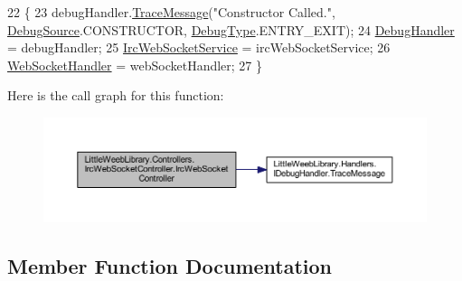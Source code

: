 \begin{DoxyCode}
22         \{
23             debugHandler.\mbox{\hyperlink{interface_little_weeb_library_1_1_handlers_1_1_i_debug_handler_a2e405bc3492e683cd3702fae125221bc}{TraceMessage}}(\textcolor{stringliteral}{"Constructor Called."}, 
      \mbox{\hyperlink{namespace_little_weeb_library_1_1_handlers_a2a6ca0775121c9c503d58aa254d292be}{DebugSource}}.CONSTRUCTOR, \mbox{\hyperlink{namespace_little_weeb_library_1_1_handlers_ab66019ed40462876ec4e61bb3ccb0a62}{DebugType}}.ENTRY\_EXIT);
24             \mbox{\hyperlink{class_little_weeb_library_1_1_handlers_1_1_debug_handler}{DebugHandler}} = debugHandler;
25             \mbox{\hyperlink{class_little_weeb_library_1_1_services_1_1_irc_web_socket_service}{IrcWebSocketService}} = ircWebSocketService;
26             \mbox{\hyperlink{class_little_weeb_library_1_1_handlers_1_1_web_socket_handler}{WebSocketHandler}} = webSocketHandler;
27         \}      
\end{DoxyCode}
Here is the call graph for this function\+:\nopagebreak
\begin{figure}[H]
\begin{center}
\leavevmode
\includegraphics[width=350pt]{class_little_weeb_library_1_1_controllers_1_1_irc_web_socket_controller_a6668898a19272a602ab6ae79a29caaaa_cgraph}
\end{center}
\end{figure}


\subsection{Member Function Documentation}
\mbox{\label{class_little_weeb_library_1_1_controllers_1_1_irc_web_socket_controller_a5ea966dddf1e0a082dd5ec28f6ace3ab}} 
